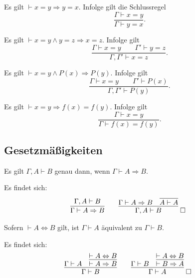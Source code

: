 \begin{Axiom}[Symmetrie]
Es gilt $\vdash x=y\Rightarrow y=x$. Infolge gilt die Schlussregel
\[\dfrac{\Gamma\vdash x=y}{\Gamma\vdash y=x}.\]
\end{Axiom}

\begin{Axiom}[Transitivität]
Es gilt $\vdash x=y\land y=z\Rightarrow x=z$. Infolge gilt
\[\dfrac{\Gamma\vdash x=y\qquad\Gamma'\vdash y=z}{\Gamma,\Gamma'\vdash x=z}.\]
\end{Axiom}

\begin{Axiom}
Es gilt $\vdash x=y\land P(x)\Rightarrow P(y)$. Infolge gilt
\[\dfrac{\Gamma\vdash x=y\qquad\Gamma'\vdash P(x)}{\Gamma,\Gamma'\vdash P(y)}.\]
\end{Axiom}

\begin{Axiom}
Es gilt $\vdash x=y\Rightarrow f(x)=f(y)$. Infolge gilt
\[\dfrac{\Gamma\vdash x=y}{\Gamma\vdash f(x)=f(y)}.\]
\end{Axiom}

\newpage
\subsection{Gesetzmäßigkeiten}
\begin{Satz}\label{sequent-dt}\newlinefirst
Es gilt $\Gamma,A\vdash B$ genau dann, wenn $\Gamma\vdash A\Rightarrow B$.
\end{Satz}
\begin{Beweis} Es findet sich:
\[\begin{array}{@{}l@{\qquad}l}
\infer{\Gamma\vdash A\Rightarrow B}{\Gamma,A\vdash B}
&
\infer{\Gamma,A\vdash B}{\Gamma\vdash A\Rightarrow B & \infer{A\vdash A}{}}
\;\qedsymbol
\end{array}
\]
\end{Beweis}

\begin{Satz}\label{eq-impl-eq-sequents}
Sofern $\vdash A\Leftrightarrow B$ gilt,
ist $\Gamma\vdash A$ äquivalent zu $\Gamma\vdash B$.
\end{Satz}
\begin{Beweis} Es findet sich:
\[\begin{array}{@{}l@{\qquad}l}
\infer{\Gamma\vdash B}{\Gamma\vdash A &
  \infer{\vdash A\Rightarrow B}{\vdash A\Leftrightarrow B}}
&
\infer{\Gamma\vdash A}{\Gamma\vdash B &
  \infer{\vdash B\Rightarrow A}{\vdash A\Leftrightarrow B}}\;\qedsymbol
\end{array}
\]
\end{Beweis}

